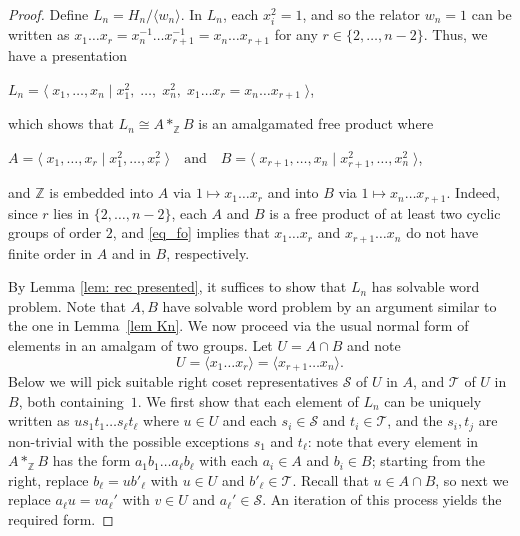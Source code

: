\documentclass[10pt,a4paper]{amsart}
\newcommand{\ZZ}{{\mathbb{Z}}}
\newcommand{\bc}{\begin{center}}
\newcommand{\ec}{\end{center}}
\newcommand{\la}{\langle}
\newcommand{\ra}{\rangle}
\begin{document}
  \begin{proof} Define $L_n = H_n/\la w_n \ra$. In $L_n$, each $x_i^2=1$, and so the relator $w_n=1$ can be written as  $x_1 \ldots x_r =  x_{n}^{-1} \ldots   x_{r+1}^{-1}=  x_{n} \ldots   x_{r+1}$ for any $r\in\{2,\ldots,n-2\}$. Thus, we have a presentation
  \bc $L_n = \la\; x_1,  \dots , x_n \mid x_1^2,\;\ldots,\;x_n^2,\; x_1 \ldots x_r =  x_{n} \ldots   x_{r+1} \;\ra$,  \ec
which shows that $L_n\cong A*_\ZZ B$ is an amalgamated free product where 
 \bc $A= \la\; x_1, \ldots, x_r \mid x_1^2,\ldots,x_r^2 \;\ra \quad\text{and}\quad B= \la\; x_{r+1}, \ldots, x_n \mid x_{r+1}^2,\ldots,x_n^2\; \ra$, \ec
 and $\ZZ$ is embedded into $A $ via $1 \mapsto x_1 \ldots x_r$ and into $B$ via $1 \mapsto   x_{n} \ldots x_{r+1} $. Indeed, since $r$ lies in $\{2,\ldots, n-2\}$, each $A$ and $B$ is a free product of at least two cyclic groups of order $2$, and \eqref{eq_fo} implies that $x_1\ldots x_r$ and $x_{r+1}\ldots x_n$ do not have finite order in $A$ and in $B$, respectively. 
 
 By Lemma \ref{lem: rec presented}, it suffices to show that $L_n$ has solvable word problem. Note that $A,B$ have solvable word problem by an argument similar to the one in Lemma~\ref{lem Kn}. We  now   proceed via the  usual normal form of elements in an amalgam of two groups.  
 Let $U = A\cap B$ and note  \[U=\langle x_1\ldots x_r\rangle = \langle x_{r+1}\ldots x_n\rangle.\] Below we will pick suitable right coset representatives $\mathcal{S}$ of $U$ in $A$,  and $\mathcal{T}$ of $U$ in $B$, both containing~$1$. We first show that each element of $L_n$ can be uniquely written as $u s_1t_1 \ldots s_\ell t_\ell$ where $u\in U$ and each $s_i\in \mathcal{S}$ and $t_i\in \mathcal{T}$, and the $s_i, t_j$ are non-trivial with the possible exceptions $s_1$ and $t_\ell$:
  note that every element in $ A*_\ZZ B$ has the form $a_1b_1\ldots a_\ell b_\ell$ with each $a_i\in A$ and $b_i\in B$; starting from the right, replace $b_\ell = ub'_\ell$ with $u\in U$ and $b'_\ell\in \mathcal{T}$. Recall that $u\in A\cap B$, so next we replace $a_\ell u = va_\ell'$ with $v\in U$ and $a_\ell'\in \mathcal{S}$. An iteration of this process yields the required form. 


\end{proof}
\end{document}
